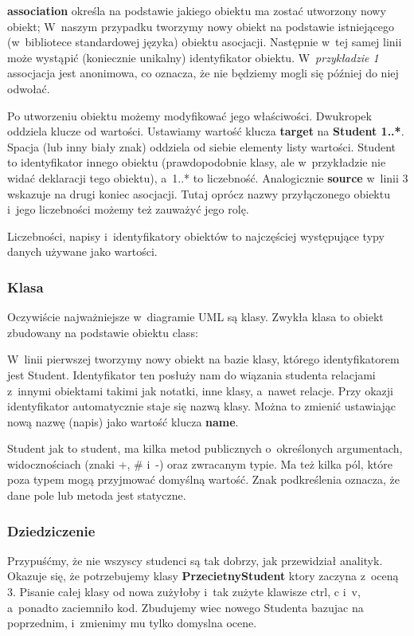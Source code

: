 \documentclass[a4paper,11pt]{article}
\begin{document}
\textbf{association} określa na podstawie jakiego obiektu ma zostać utworzony nowy obiekt; W~naszym
przypadku tworzymy nowy obiekt na podstawie istniejącego (w~bibliotece standardowej języka) obiektu
asocjacji. Następnie w~tej samej linii może wystąpić (koniecznie unikalny) identyfikator obiektu.
W~\emph{przykładzie 1} assocjacja jest anonimowa, co oznacza, że nie będziemy mogli się później do
niej odwołać.

Po utworzeniu obiektu możemy modyfikować jego właściwości. Dwukropek oddziela klucze od wartości.
Ustawiamy wartość klucza \textbf{target} na \textbf{Student 1..*}. Spacja (lub inny biały znak)
oddziela od siebie elementy listy wartości. Student to identyfikator innego obiektu (prawdopodobnie
klasy, ale w~przykładzie nie widać deklaracji tego obiektu), a~1..* to liczebność. Analogicznie
\textbf{source} w~linii 3 wskazuje na drugi koniec asocjacji. Tutaj oprócz nazwy przyłączonego
obiektu i~jego liczebności możemy też zauważyć jego rolę.

Liczebności, napisy i~identyfikatory obiektów to najczęściej występujące typy danych używane jako
wartości.

\subsubsection{Klasa}
Oczywiście najważniejsze w~diagramie UML są klasy. Zwykła klasa to obiekt zbudowany na podstawie
obiektu class:



W~linii pierwszej tworzymy nowy obiekt na bazie klasy, którego identyfikatorem jest Student.
Identyfikator ten posłuży nam do wiązania studenta relacjami z~innymi obiektami takimi jak notatki,
inne klasy, a~nawet relacje. Przy okazji identyfikator automatycznie staje się nazwą klasy. Można to
zmienić ustawiając nową nazwę (napis) jako wartość klucza \textbf{name}.

Student jak to student, ma kilka metod publicznych o~określonych argumentach, widocznościach (znaki +,
\# i~-) oraz zwracanym typie. Ma też kilka pól, które poza typem mogą przyjmować domyślną wartość.
Znak podkreślenia oznacza, że dane pole lub metoda jest statyczne.

\subsubsection{Dziedziczenie}
Przypuśćmy, że nie wszyscy studenci są tak dobrzy, jak przewidział analityk. Okazuje się, że
potrzebujemy klasy \textbf{PrzecietnyStudent} ktory zaczyna z~oceną 3. Pisanie całej klasy od nowa
zużyłoby i~tak zużyte klawisze ctrl, c i~v, a~ponadto zaciemniło kod. Zbudujemy wiec nowego Studenta
bazujac na poprzednim, i~zmienimy mu tylko domyslna ocene.
\end{document}
